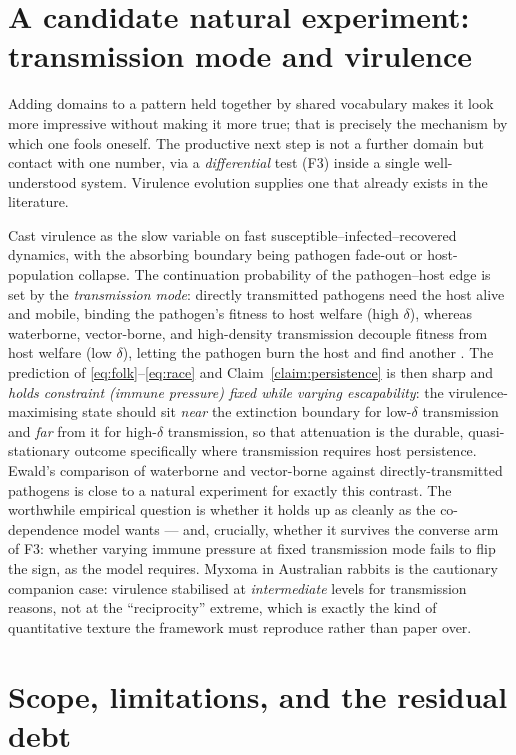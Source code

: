 \documentclass[11pt]{article}
\theoremstyle{plain}
\theoremstyle{definition}
\begin{document}
\section{A candidate natural experiment: transmission mode and virulence}
\label{sec:ewald}

Adding domains to a pattern held together by shared vocabulary makes it look more impressive without making it more true; that is precisely the mechanism by which one fools oneself. The productive next step is not a further domain but contact with one number, via a \emph{differential} test (F3) inside a single well-understood system. Virulence evolution supplies one that already exists in the literature.

Cast virulence as the slow variable on fast susceptible--infected--recovered dynamics, with the absorbing boundary being pathogen fade-out or host-population collapse. The continuation probability of the pathogen--host edge is set by the \emph{transmission mode}: directly transmitted pathogens need the host alive and mobile, binding the pathogen's fitness to host welfare (high $\delta$), whereas waterborne, vector-borne, and high-density transmission decouple fitness from host welfare (low $\delta$), letting the pathogen burn the host and find another \cite{ewald1994,frank1996}. The prediction of \eqref{eq:folk}--\eqref{eq:race} and Claim~\ref{claim:persistence} is then sharp and \emph{holds constraint (immune pressure) fixed while varying escapability}: the virulence-maximising state should sit \emph{near} the extinction boundary for low-$\delta$ transmission and \emph{far} from it for high-$\delta$ transmission, so that attenuation is the durable, quasi-stationary outcome specifically where transmission requires host persistence. Ewald's comparison of waterborne and vector-borne against directly-transmitted pathogens is close to a natural experiment for exactly this contrast. The worthwhile empirical question is whether it holds up as cleanly as the co-dependence model wants --- and, crucially, whether it survives the converse arm of F3: whether varying immune pressure at fixed transmission mode fails to flip the sign, as the model requires. Myxoma in Australian rabbits is the cautionary companion case: virulence stabilised at \emph{intermediate} levels for transmission reasons, not at the ``reciprocity'' extreme, which is exactly the kind of quantitative texture the framework must reproduce rather than paper over.

\section{Scope, limitations, and the residual debt}
\label{sec:limits}
\end{document}
